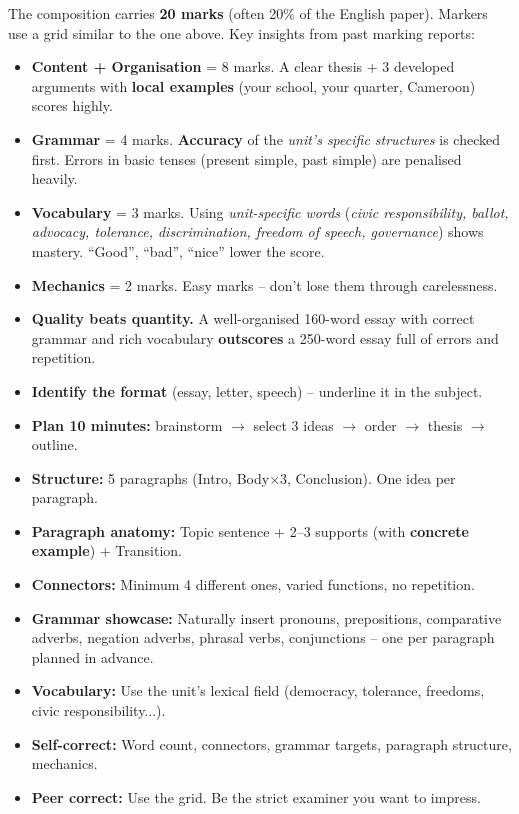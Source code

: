 \documentclass[11pt]{article}
\begin{document}
\begin{savaistu}
The composition carries \textbf{20 marks} (often 20\% of the English paper). Markers use a grid similar to the one above. Key insights from past marking reports:
\begin{itemize}
\item \textbf{Content + Organisation} = 8 marks. A clear thesis + 3 developed arguments with \textbf{local examples} (your school, your quarter, Cameroon) scores highly.
\item \textbf{Grammar} = 4 marks. \textbf{Accuracy} of the \emph{unit's specific structures} is checked first. Errors in basic tenses (present simple, past simple) are penalised heavily.
\item \textbf{Vocabulary} = 3 marks. Using \emph{unit-specific words} (\emph{civic responsibility, ballot, advocacy, tolerance, discrimination, freedom of speech, governance}) shows mastery. ``Good'', ``bad'', ``nice'' lower the score.
\item \textbf{Mechanics} = 2 marks. Easy marks -- don't lose them through carelessness.
\item \textbf{Quality beats quantity.} A well-organised 160-word essay with correct grammar and rich vocabulary \textbf{outscores} a 250-word essay full of errors and repetition.
\end{itemize}
\end{savaistu}

\begin{aretenir}
\begin{itemize}
\item \textbf{Identify the format} (essay, letter, speech) -- underline it in the subject.
\item \textbf{Plan 10 minutes:} brainstorm $\rightarrow$ select 3 ideas $\rightarrow$ order $\rightarrow$ thesis $\rightarrow$ outline.
\item \textbf{Structure:} 5 paragraphs (Intro, Body$\times$3, Conclusion). One idea per paragraph.
\item \textbf{Paragraph anatomy:} Topic sentence + 2--3 supports (with \textbf{concrete example}) + Transition.
\item \textbf{Connectors:} Minimum 4 different ones, varied functions, no repetition.
\item \textbf{Grammar showcase:} Naturally insert pronouns, prepositions, comparative adverbs, negation adverbs, phrasal verbs, conjunctions -- one per paragraph planned in advance.
\item \textbf{Vocabulary:} Use the unit's lexical field (democracy, tolerance, freedoms, civic responsibility...).
\item \textbf{Self-correct:} Word count, connectors, grammar targets, paragraph structure, mechanics.
\item \textbf{Peer correct:} Use the grid. Be the strict examiner you want to impress.
\end{itemize}
\end{aretenir}
\end{document}
